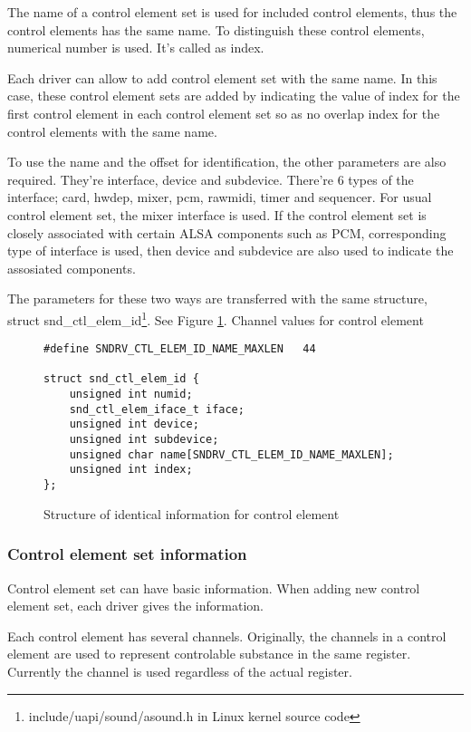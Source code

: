 \documentclass[onecolumn]{article}
\begin{document}
The name of a control element set is used for included control elements, thus the control elements has the same name. To distinguish these control elements, numerical number is used. It's called as index.

Each driver can allow to add control element set with the same name. In this case, these control element sets are added by indicating the value of index for the first control element in each control element set so as no overlap index for the control elements with the same name.

To use the name and the offset for identification, the other parameters are also required. They're interface, device and subdevice. There're 6 types of the interface; card, hwdep, mixer, pcm, rawmidi, timer and sequencer. For usual control element set, the mixer interface is used. If the control element set is closely associated with certain ALSA components such as PCM, corresponding type of interface is used, then device and subdevice are also used to indicate the assosiated components\cite{alsa-driver}.

The parameters for these two ways are transferred with the same structure, struct snd\_ctl\_elem\_id\footnote{include/uapi/sound/asound.h in Linux kernel source code}. See Figure \ref{fig:control-element-id}.
Channel values for control element
\begin{figure}[htbp]
\small
\begin{verbatim}
#define SNDRV_CTL_ELEM_ID_NAME_MAXLEN	44

struct snd_ctl_elem_id {
    unsigned int numid;
    snd_ctl_elem_iface_t iface;
    unsigned int device;
    unsigned int subdevice;
    unsigned char name[SNDRV_CTL_ELEM_ID_NAME_MAXLEN];
    unsigned int index;
};
\end{verbatim}
\caption{{Structure of identical information for control element}}
\label{fig:control-element-id}
\end{figure}


\subsubsection{Control element set information}

Control element set can have basic information. When adding new control element set, each driver gives the information.

Each control element has several channels. Originally, the channels in a control element are used to represent controlable substance in the same register. Currently the channel is used regardless of the actual register.
\end{document}
